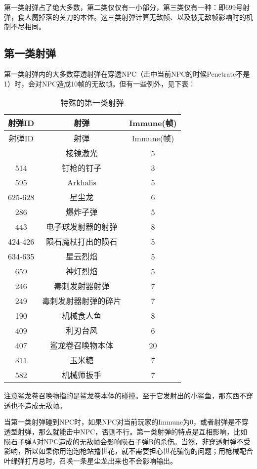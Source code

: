 第一类射弹占了绝大多数，第二类仅仅有一小部分，第三类仅有一种：即699号射弹，食人魔掉落的关刀的本体。这三类射弹计算无敌帧、以及被无敌帧影响时的机制不尽相同。

\subsection{第一类射弹}
第一类射弹内的大多数穿透射弹在穿透NPC（击中当前NPC的时候Penetrate不是1）时，会对NPC造成10帧的无敌帧。但有一些例外，见下表：
\begin{longtable}{|c|c|c|}
\caption{特殊的第一类射弹}\\ \hline
射弹ID&射弹&Immune(帧)\\ \hline
\endfirsthead
\hline 射弹ID&射弹&Immune(帧)\\\hline
\endhead
\hline
\endfoot
632 & 棱镜激光 & 5 \\ \hline
514 & 钉枪的钉子 & 3 \\ \hline
595 & Arkhalis & 5 \\ \hline
625-628 & 星尘龙 & 6 \\ \hline
286 & 爆炸子弹 & 5 \\ \hline
443 & 电子球发射器的射弹 & 8 \\ \hline
424-426 & 陨石魔杖打出的陨石 & 5 \\ \hline
634-635 & 星云烈焰 & 5 \\ \hline
659 & 神灯烈焰 & 5 \\ \hline
246 & 毒刺发射器射弹 & 7 \\ \hline
249 & 毒刺发射器射弹的碎片 & 7 \\ \hline
190 & 机械食人鱼 & 8 \\ \hline
409 & 利刃台风 & 6 \\ \hline
407 & 鲨龙卷召唤物本体 & 20 \\ \hline
311 & 玉米糖 & 7 \\ \hline
582 & 机械师扳手 & 7
\end{longtable}

注意鲨龙卷召唤物指的是鲨龙卷本体的碰撞。至于它发射出的小鲨鱼，那东西不穿透也不造成无敌帧。

当第一类射弹碰到NPC时，如果NPC对当前玩家的Immune为0，或者射弹是不穿透型射弹，那么就能击中NPC，否则不行。第一类射弹的特点是互相影响，比如陨石子弹A对NPC造成的无敌帧会影响陨石子弹B的杀伤。当然，非穿透射弹不受影响，所以如果你用泡泡枪站撸世花，就不需要担心世花骗伤的问题；用枪械配合叶绿弹打月总时，召唤一条星尘龙出来也不会影响输出。

